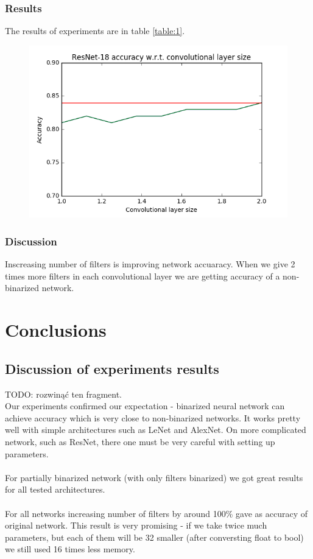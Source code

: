 \documentclass[licencjacka]{pracamgr}
\begin{document}
		\subsection{Results}
		 The results of experiments are in table \ref{table:1}.
		\begin{figure}[h]
				\centering
				\includegraphics[width=\textwidth]{images/filter-ratio}
			\end{figure}
		\subsection{Discussion}
			Inscreasing number of filters is improving network accuaracy. When we give 2 times more filters in each convolutional layer we are getting accuracy of a non-binarized network.

\chapter{Conclusions}
	\section{Discussion of experiments results}
		TODO: rozwinąć ten fragment. \\
		Our experiments confirmed our expectation - binarized neural network can achieve accuracy which is very close to non-binarized networks. It works pretty well with simple architectures such as LeNet and AlexNet. On more complicated network, such as ResNet, there one must be very careful with setting up parameters. 
		\\\\
		For partially binarized network (with only filters binarized) we got great results for all tested architectures.
		\\\\
		For all networks increasing number of filters by around 100\% gave as accuracy of original network. This result is very promising - if we take twice much parameters, but each of them will be 32 smaller (after conversting float to bool) we still used 16 times less memory.
\end{document}

